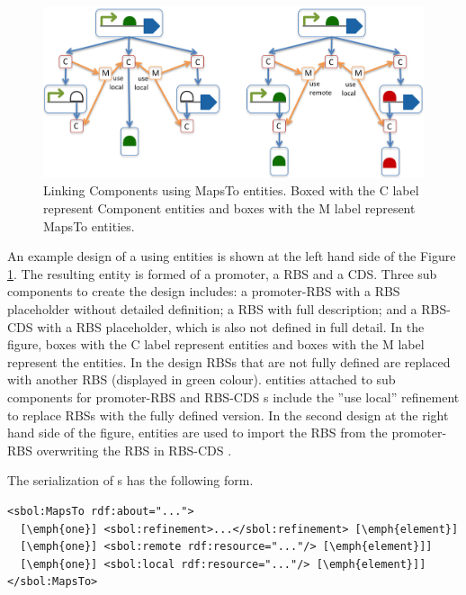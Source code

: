 \begin{figure}[ht]
\begin{center}
\includegraphics[scale=1]{images/MapsTo_Diagram2}
\caption{Linking Components using MapsTo entities. Boxed with the C label represent Component entities and boxes with the M label represent MapsTo entities.}
\label{image:maps_to_diagram2}
\end{center}
\end{figure}

An example design of a  using  entities is shown at the left hand side of the Figure \ref{image:maps_to_diagram2}. The resulting entity is formed of a promoter, a RBS and a CDS. Three sub components to create the design includes: a promoter-RBS  with a RBS placeholder without detailed definition; a RBS  with full description; and a RBS-CDS  with a RBS placeholder, which is also not defined in full detail. In the figure, boxes with the C label represent  entities and boxes with the M label represent the  entities. In the design RBSs that are not fully defined are replaced with another RBS  (displayed in green colour).  entities attached to sub components for promoter-RBS and RBS-CDS s include the ''use local'' refinement to replace RBSs with the fully defined version. In the second design at the right hand side of the figure,  entities are used to import the RBS from the promoter-RBS  overwriting the RBS in RBS-CDS . 

The serialization of s has the following form.
\begin{lstlisting}
<sbol:MapsTo rdf:about="...">
  [\emph{one}] <sbol:refinement>...</sbol:refinement> [\emph{element}]
  [\emph{one}] <sbol:remote rdf:resource="..."/> [\emph{element}]]
  [\emph{one}] <sbol:local rdf:resource="..."/> [\emph{element}]]
</sbol:MapsTo>
\end{lstlisting}


